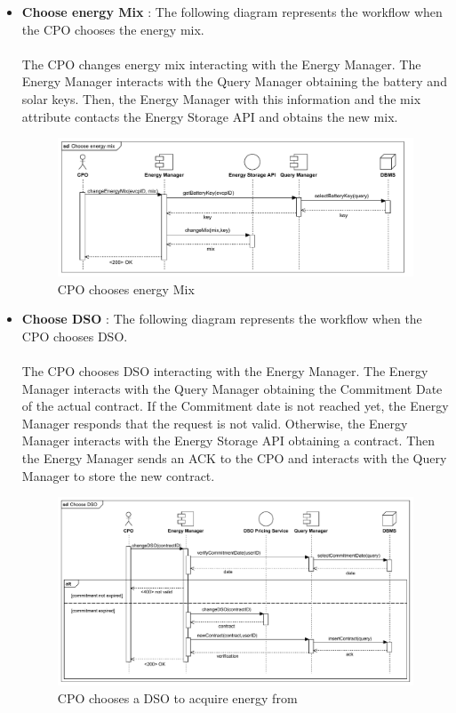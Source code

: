 \begin{itemize}
    \item \textbf{Choose energy Mix} : The following diagram represents the workflow when the CPO chooses the energy mix.\\
          \\ The CPO changes energy mix interacting with the Energy Manager. The Energy Manager interacts with the Query Manager obtaining the battery and solar keys.
          Then, the Energy Manager with this information and the mix attribute contacts the Energy Storage API and obtains the new mix.
          \begin{figure}[H]
              \centering
              \includegraphics[scale=0.65]{src/runtimeView/CPMS_energyMix.pdf}
              \caption{CPO chooses energy Mix}
          \end{figure}
          \pagebreak
    \item \textbf{Choose DSO} : The following diagram represents the workflow when the CPO chooses DSO.\\
          \\ The CPO chooses DSO interacting with the Energy Manager. The Energy Manager interacts with the Query Manager obtaining the Commitment Date of the actual contract.
          If the Commitment date is not reached yet, the Energy Manager responds that the request is not valid.
          Otherwise, the Energy Manager interacts with the Energy Storage API obtaining a contract. Then the Energy Manager sends an ACK to the CPO and interacts with the
          Query Manager to store the new contract.
          \begin{figure}[H]
              \centering
              \includegraphics[scale=0.60]{src/runtimeView/CPMS_chooseDSO.pdf}
              \caption{CPO chooses a DSO to acquire energy from}
          \end{figure}
\end{itemize}
\pagebreak
